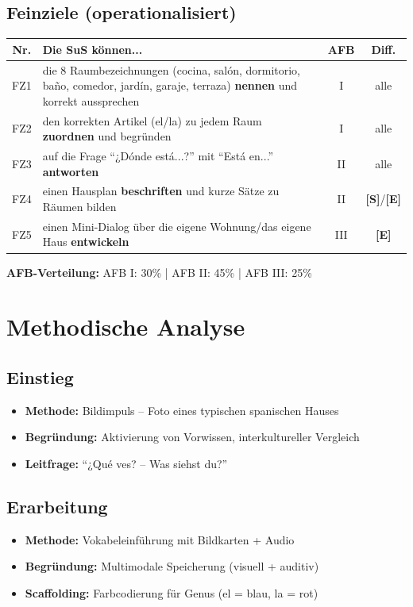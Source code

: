 \documentclass[11pt,a4paper]{article}
\newcommand{\Std}{\textcolor{standard}{\textbf{[S]}}}
\newcommand{\E}{\textcolor{erweiterung}{\textbf{[E]}}}
\begin{document}
\subsection{Feinziele (operationalisiert)}
\begin{tabular}{|c|p{7.5cm}|c|c|}
\hline
\textbf{Nr.} & \textbf{Die SuS können...} & \textbf{AFB} & \textbf{Diff.} \\
\hline
FZ1 & die 8 Raumbezeichnungen (cocina, salón, dormitorio, baño, comedor, jardín, garaje, terraza) \textbf{nennen} und korrekt aussprechen & I & alle \\
\hline
FZ2 & den korrekten Artikel (el/la) zu jedem Raum \textbf{zuordnen} und begründen & I & alle \\
\hline
FZ3 & auf die Frage ``¿Dónde está...?'' mit ``Está en...'' \textbf{antworten} & II & alle \\
\hline
FZ4 & einen Hausplan \textbf{beschriften} und kurze Sätze zu Räumen bilden & II & \Std{}/\E{} \\
\hline
FZ5 & einen Mini-Dialog über die eigene Wohnung/das eigene Haus \textbf{entwickeln} & III & \E{} \\
\hline
\end{tabular}

\vspace{1em}
\textbf{AFB-Verteilung:} AFB I: 30\% | AFB II: 45\% | AFB III: 25\%

\section{Methodische Analyse}

\subsection{Einstieg}
\begin{itemize}
    \item \textbf{Methode:} Bildimpuls -- Foto eines typischen spanischen Hauses
    \item \textbf{Begründung:} Aktivierung von Vorwissen, interkultureller Vergleich
    \item \textbf{Leitfrage:} ``¿Qué ves? -- Was siehst du?''
\end{itemize}

\subsection{Erarbeitung}
\begin{itemize}
    \item \textbf{Methode:} Vokabeleinführung mit Bildkarten + Audio
    \item \textbf{Begründung:} Multimodale Speicherung (visuell + auditiv)
    \item \textbf{Scaffolding:} Farbcodierung für Genus (el = blau, la = rot)
\end{itemize}
\end{document}
